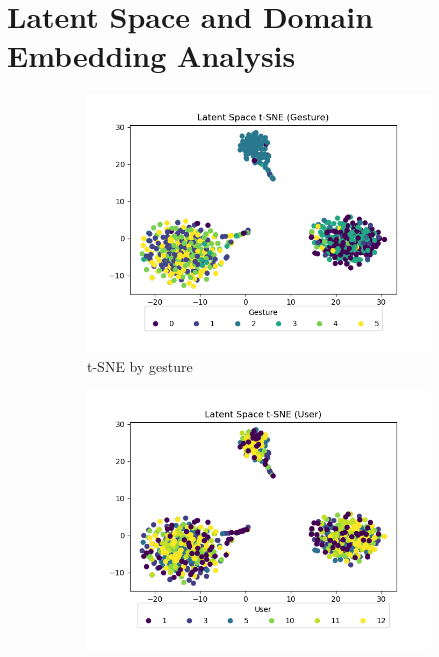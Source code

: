 \section{Latent Space and Domain Embedding Analysis}\label{sec:discussion-ls-de-analysis}

\begin{figure}
	\centering
	\begin{subfigure}{0.3\textwidth}
		\centering
		\includegraphics[width=\textwidth]{figures/mtf-ppo-one/ls-gesture}
		\caption{t-SNE by gesture}
		\label{fig:mtf-ppo-one-ls-gesture}
	\end{subfigure}
	\hfill
	\begin{subfigure}{0.3\textwidth}
		\centering
		\includegraphics[width=\textwidth]{figures/mtf-ppo-one/ls-user}

\end{subfigure}
\end{figure}
